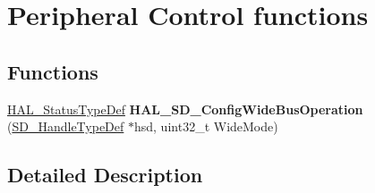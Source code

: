 \hypertarget{group___s_d___exported___functions___group3}{}\section{Peripheral Control functions}
\label{group___s_d___exported___functions___group3}
\subsection*{Functions}
\begin{DoxyCompactItemize}
\item 
\mbox{\label{group___s_d___exported___functions___group3_ga8395c55abfa691af95c004d1cb098323}} 
\mbox{\hyperlink{stm32f7xx__hal__def_8h_a63c0679d1cb8b8c684fbb0632743478f}{H\+A\+L\+\_\+\+Status\+Type\+Def}} {\bfseries H\+A\+L\+\_\+\+S\+D\+\_\+\+Config\+Wide\+Bus\+Operation} (\mbox{\hyperlink{group___s_d___exported___types___group3_ga1f31eb64a86b0c740bb5c02fa4c9914d}{S\+D\+\_\+\+Handle\+Type\+Def}} $\ast$hsd, uint32\+\_\+t Wide\+Mode)
\end{DoxyCompactItemize}


\subsection{Detailed Description}
